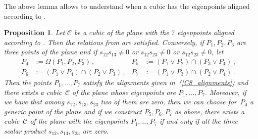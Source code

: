 \documentclass{amsart}
\theoremstyle{plain}
\newtheorem{prop}[lemma]{Proposition}
\theoremstyle{definition}
\begin{document}
%
The above lemma allows to understand when a cubic has the eigenpoints
aligned according to .
%
\begin{prop}
Let $\mathcal{C}$ be a cubic of the plane with the $7$ eigenpoints
aligned according to .
Then the relations from  are satisfied.
Conversely, if $P_1, P_2, P_3$ are three points of the plane
and if $s_{12}s_{13} \not = 0$ or $s_{12}s_{23} \not = 0$ or
$s_{12}s_{23} \not = 0$, let
%
\begin{align*}
  P_4 &:= \Omega(P_1, P_2, P_3) \,, & P_5 &:= (P_1 \vee P_2) \cap (P_3 \vee P_4) \,, \\
  P_6 &:= (P_1 \vee P_4) \cap (P_2 \vee P_3) \,,  & P_7 &:= (P_1 \vee P_3) \cap (P_2 \vee P_4) \,.
\end{align*}
%
Then the points $P_1, \dots, P_7$ satisfy the alignments given
in~(\ref{C8_alignments}) and there exists a cubic~$\mathcal{C}$
of the plane whose eigenpoints are $P_1, \dotsc, P_7$. Moreover, if
we have that among $s_{12}, s_{13}, s_{23}$ two of them are zero,
then we can choose for~$P_4$ a generic point of the plane and if we construct
$P_5, P_6, P_7$ as above, there exists a cubic~$\mathcal{C}$ of the
plane with the eigenpoints $P_1, \dotsc, P_7$ if and only if
all the three scalar product $s_{12}, s_{13}, s_{23}$ are zero.
\end{prop}
%
\end{document}

